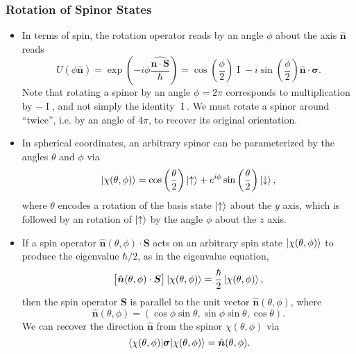 \documentclass[11pt, a4paper]{article}
\renewcommand{\vec}[1]{\bm{#1}}  %
\newcommand{\uvec}[1]{\hat{\vec{#1}}}  %
\newcommand{\ua}{\uparrow}  %
\newcommand{\da}{\downarrow}  %
\renewcommand{\S}{\vec{S}}  %
\newcommand{\II}{\operatorname{I}}  %
\begin{document}
\subsubsection{Rotation of Spinor States}
\begin{itemize}

	\item In terms of spin, the rotation operator reads by an angle $ \phi $ about the axis $ \uvec{n} $ reads
    \begin{equation*}
        U(\phi \uvec{n}) = \exp \left( - i \phi \frac{\uvec{n\cdot \S}}{\hbar} \right) = \cos \left(\frac{\phi}{2}\right)\II - i \sin \left(\frac{\phi}{2}\right)\uvec{n} \cdot \vec{\sigma}.
	\end{equation*}
	Note that rotating a spinor by an angle $ \phi = 2\pi $ corresponds to multiplication by $ -\II $, and not simply the identity $ \II $. We must rotate a spinor around ``twice'', i.e. by an angle of $ 4\pi $, to recover its original orientation.
	

    \item In spherical coordinates, an arbitrary spinor can be parameterized by the angles $ \theta $ and $ \phi $ via
    \begin{equation*}
		\ket{\chi(\theta, \phi)} = \cos \left(\frac{\theta}{2}\right)\ket{\ua} + e^{i \phi} \sin \left(\frac{\theta}{2}\right)\ket{\da},
    \end{equation*}
    where $ \theta $ encodes a rotation of the basis state $ \ket{\ua} $ about the $ y $ axis, which is followed by an rotation of $ \ket{\ua} $ by the angle $ \phi $ about the $ z $ axis.
    
    

    \item If a spin operator $ \uvec{n}(\theta, \phi) \cdot \S $ acts on an arbitrary spin state $ \ket{\chi(\theta, \phi)} $ to produce the eigenvalue $ \hbar/2 $, as in the eigenvalue equation,
	\begin{equation*}
        \big[ \uvec{n}(\theta, \phi) \cdot \S \big] \ket{\chi(\theta, \phi)} = \frac{\hbar}{2} \ket{\chi(\theta, \phi)},
	\end{equation*}
    then the spin operator $ \S $ is parallel to the unit vector $ \uvec{n}(\theta, \phi) $, where
    \begin{equation*}
        \uvec{n}(\theta, \phi) = (\cos \phi \sin \theta, \sin \phi \sin \theta, \cos \theta).
    \end{equation*}
    We can recover the direction $ \uvec{n} $ from the spinor $ \chi(\theta, \phi) $ via
	\begin{equation*}
		\mel{\chi(\theta, \phi)}{\vec{\sigma}}{\chi(\theta, \phi)} = \uvec{n}(\theta, \phi).
	\end{equation*}

\end{itemize}
\end{document}
